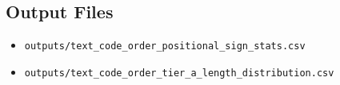 ﻿\documentclass[11pt,a4paper]{article}
\begin{document}
\subsection*{Output Files}

\begin{itemize}
\item \texttt{outputs/text\_code\_order\_positional\_sign\_stats.csv}
\item \texttt{outputs/text\_code\_order\_tier\_a\_length\_distribution.csv}
\end{itemize}
\end{document}
